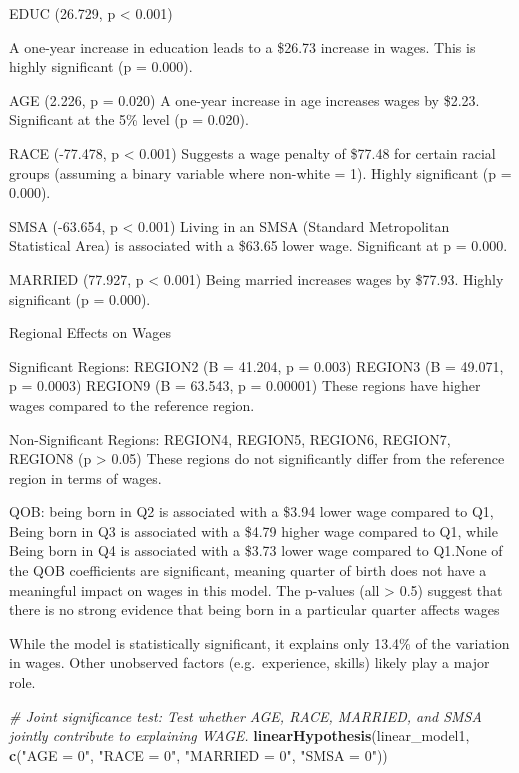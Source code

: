 \documentclass[
]{article}
\newenvironment{Shaded}{\begin{snugshade}}{\end{snugshade}}
\newcommand{\CommentTok}[1]{\textcolor[rgb]{0.56,0.35,0.01}{\textit{#1}}}
\newcommand{\FunctionTok}[1]{\textcolor[rgb]{0.13,0.29,0.53}{\textbf{#1}}}
\newcommand{\NormalTok}[1]{#1}
\newcommand{\StringTok}[1]{\textcolor[rgb]{0.31,0.60,0.02}{#1}}
\begin{document}
EDUC (26.729, p \textless{} 0.001)

A one-year increase in education leads to a \$26.73 increase in wages.
This is highly significant (p = 0.000).

AGE (2.226, p = 0.020) A one-year increase in age increases wages by
\$2.23. Significant at the 5\% level (p = 0.020).

RACE (-77.478, p \textless{} 0.001) Suggests a wage penalty of \$77.48
for certain racial groups (assuming a binary variable where non-white =
1). Highly significant (p = 0.000).

SMSA (-63.654, p \textless{} 0.001) Living in an SMSA (Standard
Metropolitan Statistical Area) is associated with a \$63.65 lower wage.
Significant at p = 0.000.

MARRIED (77.927, p \textless{} 0.001) Being married increases wages by
\$77.93. Highly significant (p = 0.000).

Regional Effects on Wages

Significant Regions: REGION2 (B = 41.204, p = 0.003) REGION3 (B =
49.071, p = 0.0003) REGION9 (B = 63.543, p = 0.00001) These regions have
higher wages compared to the reference region.

Non-Significant Regions: REGION4, REGION5, REGION6, REGION7, REGION8 (p
\textgreater{} 0.05) These regions do not significantly differ from the
reference region in terms of wages.

QOB: being born in Q2 is associated with a \$3.94 lower wage compared to
Q1, Being born in Q3 is associated with a \$4.79 higher wage compared to
Q1, while Being born in Q4 is associated with a \$3.73 lower wage
compared to Q1.None of the QOB coefficients are significant, meaning
quarter of birth does not have a meaningful impact on wages in this
model. The p-values (all \textgreater{} 0.5) suggest that there is no
strong evidence that being born in a particular quarter affects wages

While the model is statistically significant, it explains only 13.4\% of
the variation in wages. Other unobserved factors (e.g.~experience,
skills) likely play a major role.

\begin{Shaded}
\begin{Highlighting}[]
\CommentTok{\# Joint significance test: Test whether AGE, RACE, MARRIED, and SMSA jointly contribute to explaining WAGE.}
\FunctionTok{linearHypothesis}\NormalTok{(linear\_model1, }\FunctionTok{c}\NormalTok{(}\StringTok{"AGE = 0"}\NormalTok{, }\StringTok{"RACE = 0"}\NormalTok{, }\StringTok{"MARRIED = 0"}\NormalTok{, }\StringTok{"SMSA = 0"}\NormalTok{))}
\end{Highlighting}
\end{Shaded}
\end{document}
